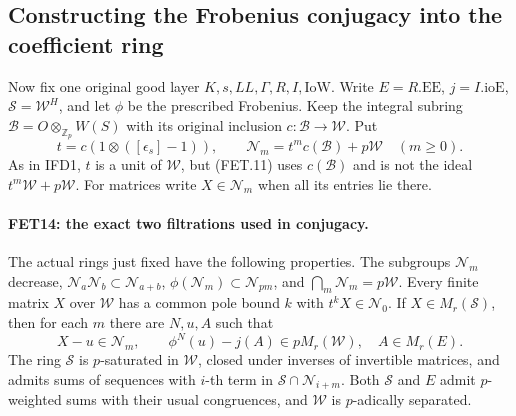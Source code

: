 \documentclass[11pt,a4paper]{article}
\numberwithin{equation}{section}
\theoremstyle{remark}\newtheorem{remark}[theorem]{Remark}
\begin{document}
\subsection{Constructing the Frobenius conjugacy into the coefficient ring}

Now fix one original good layer $K,s,LL,\Gamma,R,I,\mathrm{IoW}$.
Write $E=R.\mathrm{EE}$, $j=I.\mathrm{ioE}$,
$\mathcal S=\mathcal W^H$, and let $\phi$ be the prescribed
Frobenius. Keep the integral subring
$\mathcal B=O\otimes_{\mathbb Z_p}W(S)$ with its original
inclusion $c:\mathcal B\to\mathcal W$. Put
\[
 t=c(1\otimes([\epsilon_s]-1)),\qquad
 \mathcal N_m=t^m c(\mathcal B)+p\mathcal W\quad(m\geq0).
                                                               \tag{FET.11}
\]
As in IFD1, $t$ is a unit of $\mathcal W$, but (FET.11)
uses $c(\mathcal B)$ and is not the ideal
$t^m\mathcal W+p\mathcal W$. For matrices write
$X\in\mathcal N_m$ when all its entries lie there.

\paragraph{FET14: the exact two filtrations used in conjugacy.}
\label{claim:FET14}
The actual rings just fixed have the following properties.
The subgroups $\mathcal N_m$ decrease,
$\mathcal N_a\mathcal N_b\subset\mathcal N_{a+b}$,
$\phi(\mathcal N_m)\subset\mathcal N_{pm}$, and
$\bigcap_m\mathcal N_m=p\mathcal W$.
Every finite matrix $X$ over $\mathcal W$ has a common pole bound
$k$ with $t^kX\in\mathcal N_0$.
If $X\in M_r(\mathcal S)$, then for each $m$ there are $N,u,A$
such that
\[
 X-u\in\mathcal N_m,\qquad
                \phi^N(u)-j(A)\in pM_r(\mathcal W),
                         \quad A\in M_r(E).               \tag{FET.12}
\]
The ring $\mathcal S$ is $p$-saturated in $\mathcal W$, closed
under inverses of invertible matrices, and admits sums of sequences
with $i$-th term in $\mathcal S\cap\mathcal N_{i+m}$.
Both $\mathcal S$ and $E$ admit $p$-weighted sums with their
usual congruences, and $\mathcal W$ is $p$-adically separated.
\end{document}
